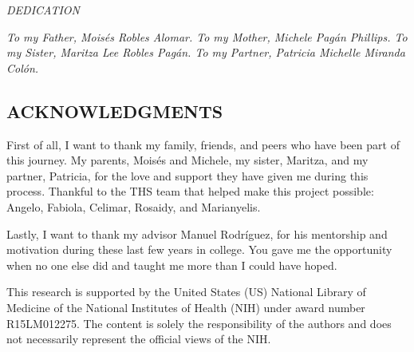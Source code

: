 


\vspace*{2in}
\begin{center}
	\textit{DEDICATION}
\end{center}

\begin{center}
	\textit{To my Father, Mois\'es Robles Alomar. To my Mother, Michele Pag\'an Phillips. To my Sister, Maritza Lee Robles Pag\'an. To my Partner, Patricia Michelle Miranda Col\'on.}
\end{center}

\newpage


\vspace*{0.5in}
\begin{center}
\section*{ACKNOWLEDGMENTS}
\end{center}


\noindent First of all, I want to thank my family, friends, and peers who have been part of this journey. My parents, Mois\'es and Michele, my sister, Maritza, and my partner, Patricia, for the love and support they have given me during this process. Thankful to the THS team that helped make this project possible: Angelo, Fabiola, Celimar, Rosaidy, and Marianyelis. 

Lastly, I want to thank my advisor Manuel Rodríguez, for his mentorship and motivation during these last few years in college. You gave me the opportunity when no one else did and taught me more than I could have hoped. 

This research is supported by the United States (US) National Library of Medicine of the National Institutes of Health (NIH) under award number R15LM012275. The content is solely the responsibility of the authors and does not necessarily represent the official views of the NIH. 




